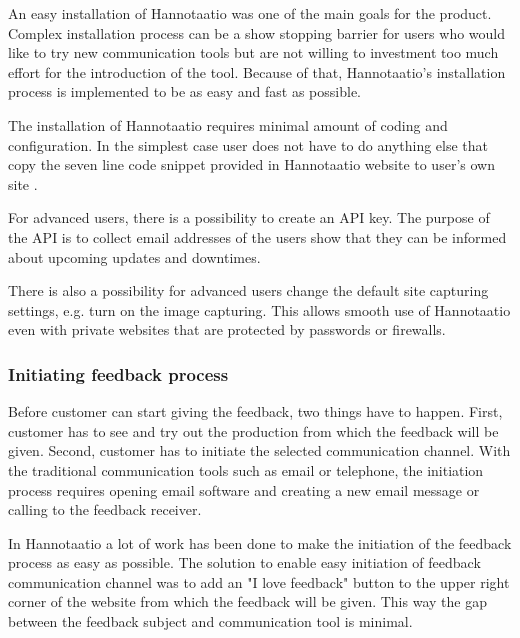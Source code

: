 \documentclass[english,12pt,a4paper,pdftex]{article}
\begin{document}
An easy installation of Hannotaatio was one of the main goals for the product. Complex installation process can be a show stopping barrier for users who would like to try new communication tools but are not willing to investment too much effort for the introduction of the tool. Because of that, Hannotaatio's installation process is implemented to be as easy and fast as possible.

The installation of Hannotaatio requires minimal amount of coding and configuration. In the simplest case user does not have to do anything else that copy the seven line code snippet provided in Hannotaatio website to user's own site \citep{hannotaatio}.

For advanced users, there is a possibility to create an \ac{API} key. The purpose of the \ac{API} is to collect email addresses of the users show that they can be informed about upcoming updates and downtimes.

There is also a possibility for advanced users change the default site capturing settings, e.g. turn on the image capturing. This allows smooth use of Hannotaatio even with private websites that are protected by passwords or firewalls.

\subsubsection{Initiating feedback process}

Before customer can start giving the feedback, two things have to happen. First, customer has to see and try out the production from which the feedback will be given. Second, customer has to initiate the selected communication channel. With the traditional communication tools such as email or telephone, the initiation process requires opening email software and creating a new email message or calling to the feedback receiver.

In Hannotaatio a lot of work has been done to make the initiation of the feedback process as easy as possible. The solution to enable easy initiation of feedback communication channel was to add an "I love feedback" button to the upper right corner of the website from which the feedback will be given. This way the gap between the feedback subject and communication tool is minimal.
\end{document}
